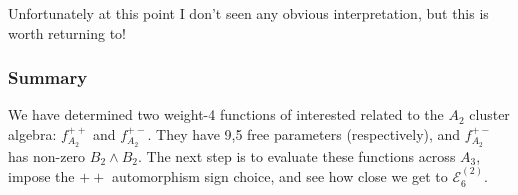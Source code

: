 \documentclass[12pt]{article}
\begin{document}
\noindent Unfortunately at this point I don't seen any obvious interpretation, but this is worth returning to!

\subsubsection*{Summary}

We have determined two weight-4 functions of interested related to the $A_2$ cluster algebra: $f_{A_2}^{++}$ and $f_{A_2}^{+-}$. They have 9,5 free parameters (respectively), and $f_{A_2}^{+-}$ has non-zero $B_2\wedge B_2$. The next step is to evaluate these functions across $A_3$, impose the $++$ automorphism sign choice, and see how close we get to $\mathcal{E}^{(2)}_6$.
\end{document}
